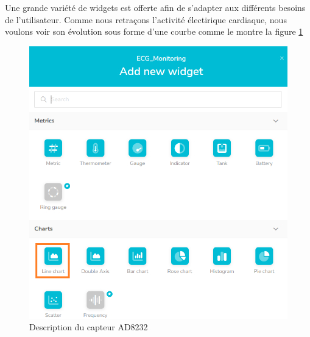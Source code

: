 Une grande variété de widgets est offerte afin de s'adapter aux différents besoins de l'utilisateur. Comme nous retraçons l'activité électirique cardiaque, nous voulons voir son évolution sous forme d'une courbe comme le montre la figure \ref{newwidget}

\begin{figure}[H]
  \centering
  \includegraphics[scale=.4]{imgs/newwidget.png}
  \caption{Description du capteur AD8232 \label{newwidget}}
\end{figure}